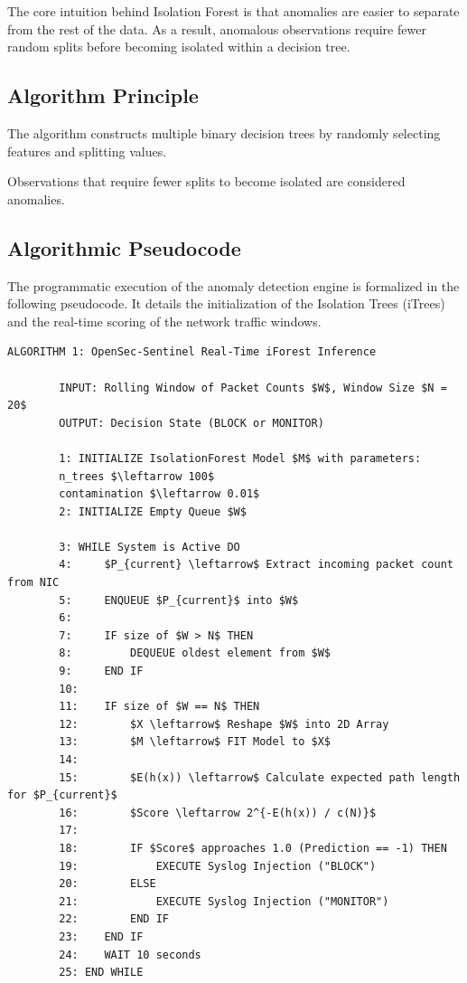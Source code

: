 \documentclass[12pt, a4paper]{report}
\begin{document}
	The core intuition behind Isolation Forest is that anomalies are easier to
	separate from the rest of the data. As a result, anomalous observations require
	fewer random splits before becoming isolated within a decision tree.
	
	\subsection{Algorithm Principle}
	
	The algorithm constructs multiple binary decision trees by randomly
	selecting features and splitting values.
	
	Observations that require fewer splits to become isolated are considered
	anomalies.
	
	\subsection{Algorithmic Pseudocode}
	The programmatic execution of the anomaly detection engine is formalized in the following pseudocode. It details the initialization of the Isolation Trees (iTrees) and the real-time scoring of the network traffic windows.
	
	\begin{lstlisting}[caption=Pseudocode: Isolation Forest Network Anomaly Detection, mathescape=true]
		ALGORITHM 1: OpenSec-Sentinel Real-Time iForest Inference
		
		INPUT: Rolling Window of Packet Counts $W$, Window Size $N = 20$
		OUTPUT: Decision State (BLOCK or MONITOR)
		
		1: INITIALIZE IsolationForest Model $M$ with parameters:
		n_trees $\leftarrow 100$
		contamination $\leftarrow 0.01$
		2: INITIALIZE Empty Queue $W$
		
		3: WHILE System is Active DO
		4:     $P_{current} \leftarrow$ Extract incoming packet count from NIC
		5:     ENQUEUE $P_{current}$ into $W$
		6:     
		7:     IF size of $W > N$ THEN
		8:         DEQUEUE oldest element from $W$
		9:     END IF
		10:    
		11:    IF size of $W == N$ THEN
		12:        $X \leftarrow$ Reshape $W$ into 2D Array
		13:        $M \leftarrow$ FIT Model to $X$
		14:        
		15:        $E(h(x)) \leftarrow$ Calculate expected path length for $P_{current}$
		16:        $Score \leftarrow 2^{-E(h(x)) / c(N)}$
		17:        
		18:        IF $Score$ approaches 1.0 (Prediction == -1) THEN
		19:            EXECUTE Syslog Injection ("BLOCK")
		20:        ELSE
		21:            EXECUTE Syslog Injection ("MONITOR")
		22:        END IF
		23:    END IF
		24:    WAIT 10 seconds
		25: END WHILE
	\end{lstlisting}
	
\end{document}
